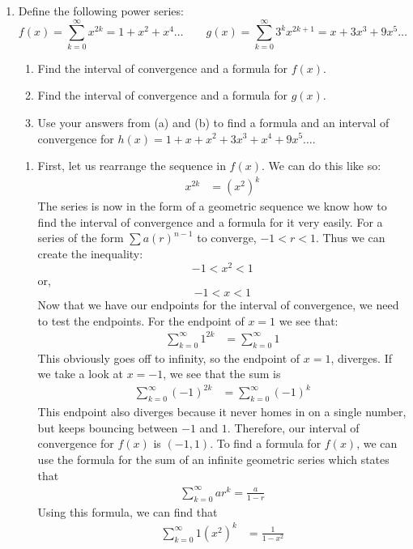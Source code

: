 \documentclass{article}
\begin{document}
\begin{enumerate}[label=\textbf{(13.\arabic*)}]
\newpage

\item Define the following power series:
\[f(x)=\sum_{k=0}^\infty x^{2k}=1+x^2+x^4\ldots\quad\quad g(x)=\sum_{k=0}^\infty 3^kx^{2k+1}=x+3x^3+9x^5\ldots\]
\begin{enumerate}
\item Find the interval of convergence and a formula for $f(x)$.
\item Find the interval of convergence and a formula for $g(x)$.
\item Use your answers from (a) and (b) to find a formula and an interval of convergence for $h(x)=1+x+x^2+3x^3+x^4+9x^5\ldots$.
\end{enumerate}

\begin{enumerate}
\item First, let us rearrange the sequence in $f(x)$. We can do this like so:
\begin{align*}
x^{2k} &= \left(x^2\right)^k
\end{align*}
The series is now in the form of a geometric sequence we know how to find the interval of convergence and a formula for it very easily. For a series of the form $\sum a(r)^{n-1}$ to converge, $-1<r<1$. Thus we can create the inequality:
\[-1<x^2<1\]
or,
\[-1<x<1\]
Now that we have our endpoints for the interval of convergence, we need to test the endpoints. For the endpoint of $x=1$ we see that:
\begin{align*}
\sum_{k=0}^\infty 1^{2k} &= \sum_{k=0}^\infty 1
\end{align*}
This obviously goes off to infinity, so the endpoint of $x=1$, diverges. If we take a look at $x=-1$, we see that the sum is
\begin{align*}
\sum_{k=0}^\infty (-1)^{2k} &= \sum_{k=0}^\infty (-1)^{k}
\end{align*}
This endpoint also diverges because it never homes in on a single number, but keeps bouncing between $-1$ and $1$. Therefore, our interval of convergence for $f(x)$ is $(-1,1)$. To find a formula for $f(x)$, we can use the formula for the sum of an infinite geometric series which states that
\begin{align*}
\sum_{k=0}^\infty ar^k=\frac{a}{1-r}
\end{align*}
Using this formula, we can find that
\begin{align*}
\sum_{k=0}^\infty 1\left(x^2\right)^k &= \frac{1}{1-x^2}
\end{align*}

\end{enumerate}
\end{enumerate}
\end{document}
